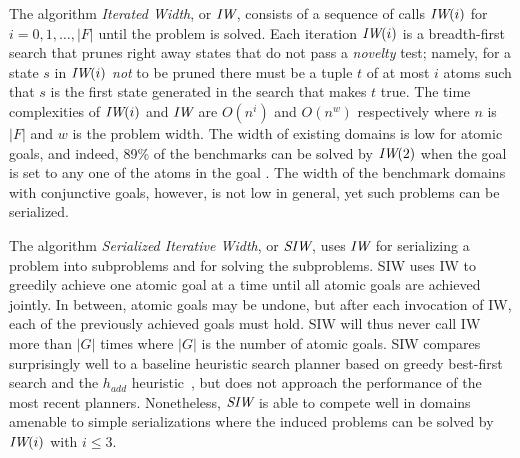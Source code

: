 
The algorithm  \emph{Iterated Width},  or ${\textit{IW}}$,
consists  of a sequence of calls ${\textit{IW}}(i)$ for $i=0,1,\ldots, |F|$
until the problem is solved. Each iteration ${\textit{IW}}(i)$ is a 
breadth-first search that prunes right away  states  that do not pass a   \emph{novelty} test; 
namely, for a state $s$ in ${\textit{IW}}(i)$ \emph{not} to be pruned there must be 
a tuple $t$ of at most $i$ atoms such that $s$ is the first state 
generated in the search that makes $t$ true. The time complexities of ${\textit{IW}}(i)$ and ${\textit{IW}}$
are  $O(n^i)$ and $O(n^w)$ respectively  where $n$ is $|F|$ and $w$ is the problem width.
The width of existing domains is low for atomic goals,  and indeed,  89\% of the  benchmarks
can be solved by ${\textit{IW}}(2)$ when the goal is set to any one of the atoms in the goal \cite{nir:ecai12}.
The width of the benchmark domains with conjunctive goals, however, is not low in general,
yet such problems can be serialized.


The algorithm \emph{Serialized Iterative Width}, or ${\textit{SIW}}$, uses ${\textit{IW}}$
for serializing a problem into subproblems and for solving the
subproblems.  SIW uses IW to greedily achieve one atomic goal at a
time until all atomic goals are achieved jointly. In
between, atomic goals may be undone, but after each invocation of IW,
each of the previously achieved goals must hold. SIW will thus never
call IW more than $|G|$ times where $|G|$ is the number of atomic
goals. SIW compares surprisingly well to a baseline heuristic search
planner based on greedy best-first search and the $h_{add}$
heuristic~\cite{bonet:aij-hsp}, but does not approach the performance
of the most recent planners. Nonetheless, ${\textit{SIW}}$ is able to compete well in
domains amenable to simple serializations where the induced problems can
be solved by ${\textit{IW}}(i)$ with $i\leq3$.
